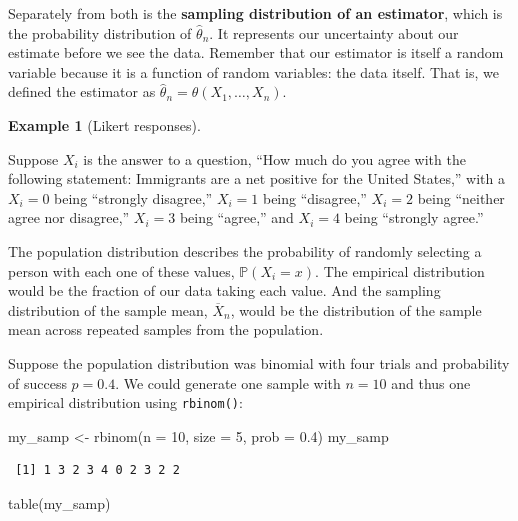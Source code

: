 \documentclass[
  letterpaper,
  DIV=11,
  numbers=noendperiod]{scrreprt}
\newenvironment{Shaded}{\begin{snugshade}}{\end{snugshade}}
\newcommand{\AttributeTok}[1]{\textcolor[rgb]{0.40,0.45,0.13}{#1}}
\newcommand{\DecValTok}[1]{\textcolor[rgb]{0.68,0.00,0.00}{#1}}
\newcommand{\FloatTok}[1]{\textcolor[rgb]{0.68,0.00,0.00}{#1}}
\newcommand{\FunctionTok}[1]{\textcolor[rgb]{0.28,0.35,0.67}{#1}}
\newcommand{\NormalTok}[1]{\textcolor[rgb]{0.00,0.23,0.31}{#1}}
\newcommand{\OtherTok}[1]{\textcolor[rgb]{0.00,0.23,0.31}{#1}}
\renewcommand{\P}{\mathbb{P}}
\newcommand{\Xbar}{\overline{X}}
\theoremstyle{definition}
\theoremstyle{plain}
\theoremstyle{definition}
\newtheorem{example}{Example}[chapter]
\theoremstyle{remark}
\begin{document}
Separately from both is the \textbf{sampling distribution of an
estimator}, which is the probability distribution of
\(\widehat{\theta}_n\). It represents our uncertainty about our estimate
before we see the data. Remember that our estimator is itself a random
variable because it is a function of random variables: the data itself.
That is, we defined the estimator as
\(\widehat{\theta}_n = \theta(X_1, \ldots, X_n)\).

\begin{example}[Likert
responses]\protect\hypertarget{exm-three-dist}{}\label{exm-three-dist}

Suppose \(X_i\) is the answer to a question, ``How much do you agree
with the following statement: Immigrants are a net positive for the
United States,'' with a \(X_i = 0\) being ``strongly disagree,''
\(X_i = 1\) being ``disagree,'' \(X_i = 2\) being ``neither agree nor
disagree,'' \(X_i = 3\) being ``agree,'' and \(X_i = 4\) being
``strongly agree.''

The population distribution describes the probability of randomly
selecting a person with each one of these values, \(\P(X_i = x)\). The
empirical distribution would be the fraction of our data taking each
value. And the sampling distribution of the sample mean, \(\Xbar_n\),
would be the distribution of the sample mean across repeated samples
from the population.

Suppose the population distribution was binomial with four trials and
probability of success \(p = 0.4\). We could generate one sample with
\(n = 10\) and thus one empirical distribution using \texttt{rbinom()}:

\begin{Shaded}
\begin{Highlighting}[]
\NormalTok{my\_samp }\OtherTok{\textless{}{-}} \FunctionTok{rbinom}\NormalTok{(}\AttributeTok{n =} \DecValTok{10}\NormalTok{, }\AttributeTok{size =} \DecValTok{5}\NormalTok{, }\AttributeTok{prob =} \FloatTok{0.4}\NormalTok{)}
\NormalTok{my\_samp}
\end{Highlighting}
\end{Shaded}

\begin{verbatim}
 [1] 1 3 2 3 4 0 2 3 2 2
\end{verbatim}

\begin{Shaded}
\begin{Highlighting}[]
\FunctionTok{table}\NormalTok{(my\_samp)}
\end{Highlighting}
\end{Shaded}


\end{example}
\end{document}
